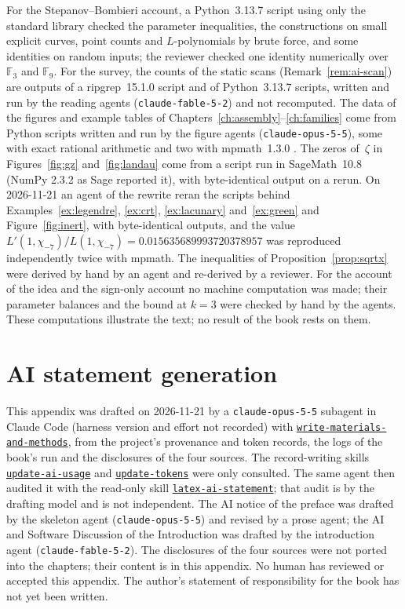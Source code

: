 \documentclass[11pt]{amsbook}
\theoremstyle{plain}
\theoremstyle{definition}
\theoremstyle{remark}
\numberwithin{equation}{section}
\numberwithin{figure}{chapter}
\numberwithin{table}{chapter}
\newcommand{\F}{\mathbb{F}}
\newcommand{\vtwoskillurl}{https://github.com/tdupu/%
agent-skills-public/blob/8d13efb5e66306aeae6e3b948bc463e7e2db1b65}
\newcommand{\vtwoskill}[1]{%
\href{\vtwoskillurl/skills/#1/SKILL.md}{\texttt{#1}}}
\begin{document}
For the Stepanov--Bombieri account, a Python~3.13.7 script
\cite[\href{https://www.python.org/downloads/release/python-3137/}%
{release page}]{Python} using only the standard library checked the
parameter inequalities, the constructions on small explicit curves,
point counts and $L$-polynomials by brute force, and some identities on
random inputs; the reviewer checked one identity numerically over
$\F_3$ and $\F_9$. For the survey, the counts of the static scans
(Remark~\ref{rem:ai-scan}) are outputs of a ripgrep~15.1.0
script \cite[\href{https://github.com/BurntSushi/ripgrep/releases/%
tag/15.1.0}{release 15.1.0}]{Ripgrep} and of Python~3.13.7 scripts,
written and run by the reading agents (\texttt{claude-fable-5-2}) and
not recomputed. The data of the figures and example tables of
Chapters~\ref{ch:assembly}--\ref{ch:families} come from Python scripts
written and run by the figure agents (\texttt{claude-opus-5-5}), some
with exact rational arithmetic and two with mpmath~1.3.0
\cite[\href{https://mpmath.org/}{home page}]{Mpmath}. The zeros
of~$\zeta$ in Figures~\ref{fig:gz} and~\ref{fig:landau} come from a
script run in SageMath~10.8
\cite[\href{https://www.sagemath.org/}{home page}]{SageMath} (NumPy
2.3.2 \cite[\href{https://doi.org/10.1038/s41586-020-2649-2}{DOI}]%
{Harris2020numpy} as Sage reported it), with byte-identical output on
a rerun. On 2026-11-21 an agent of the rewrite reran the scripts
behind Examples~\ref{ex:legendre}, \ref{ex:crt}, \ref{ex:lacunary}
and~\ref{ex:green} and Figure~\ref{fig:inert}, with byte-identical
outputs, and the value $L'(1,\chi_{-7})/L(1,\chi_{-7})=
0.015635689993720378957$ was reproduced independently twice with
mpmath. The inequalities of Proposition~\ref{prop:sqrtx} were derived
by hand by an agent and re-derived by a reviewer. For the account of
the idea and the sign-only account no machine computation was made;
their parameter balances and the bound at $k=3$ were checked by hand
by the agents. These computations illustrate the text; no result of
the book rests on them.

\section{AI statement generation}
\label{sec:ai-statement}
This appendix was drafted on 2026-11-21 by a \texttt{claude-opus-5-5}
subagent in Claude Code (harness version and effort not recorded) with
\vtwoskill{write-materials-and-methods}, from the project's
provenance and token records, the logs of the book's run and the
disclosures of the four sources. The record-writing skills
\vtwoskill{update-ai-usage} and \vtwoskill{update-tokens} were only
consulted. The same agent then audited it with the read-only skill
\vtwoskill{latex-ai-statement}; that audit is by the drafting model
and is not independent. The AI notice of the preface was drafted by
the skeleton agent (\texttt{claude-opus-5-5}) and revised by a prose
agent; the AI and Software Discussion of the Introduction was drafted
by the introduction agent (\texttt{claude-fable-5-2}). The
disclosures of the four sources were not ported into the
chapters; their content is in this appendix. No human has reviewed or
accepted this appendix. The author's statement of responsibility for
the book has not yet been written.
\end{document}
